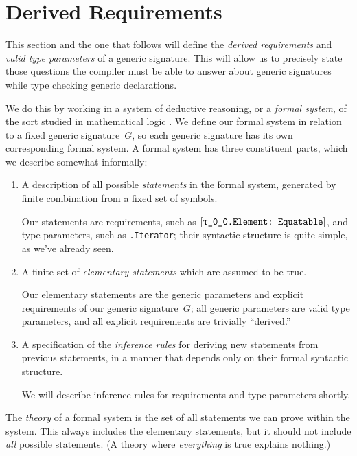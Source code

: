 \documentclass[../generics]{subfiles}
\begin{document}
\section{Derived Requirements}\label{derived req}

This section and the one that follows will define the \emph{derived requirements} and \emph{valid type parameters} of a generic signature. This will allow us to precisely state those questions the compiler must be able to answer about generic signatures while type checking generic declarations.

We do this by working in a system of deductive reasoning, or a \emph{formal system}, of the sort studied in mathematical logic \cite{curry}. We define our formal system in relation to a fixed generic signature~$G$, so each generic signature has its own corresponding formal system. A formal system has three constituent parts, which we describe somewhat informally:
\begin{enumerate}
\item A description of all possible \emph{statements} in the formal system, generated by finite combination from a fixed set of symbols.

Our statements are requirements, such as $\ConfReq{\rT.Element}{Equatable}$, and type parameters, such as \texttt{\rU.Iterator}; their syntactic structure is quite simple, as we've already seen.
\item A finite set of \emph{elementary statements} which are assumed to be true.

Our elementary statements are the generic parameters and explicit requirements of our generic signature~$G$; all generic parameters are valid type parameters, and all explicit requirements are trivially ``derived.''

\item A specification of the \emph{inference rules} for deriving new statements from previous statements, in a manner that depends only on their formal syntactic structure.

We will describe inference rules for requirements and type parameters shortly.
\end{enumerate}

The \emph{theory} of a formal system is the set of all statements we can prove within the system. This always includes the elementary statements, but it should not include \emph{all} possible statements. (A theory where \emph{everything} is true explains nothing.)
\end{document}
